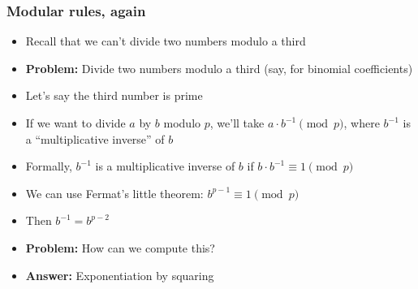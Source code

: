 \documentclass[t, handout]{beamer}
\begin{document}
\begin{frame}[fragile]
    
    \frametitle{Modular rules, again}
    
    \begin{itemize}
        \item Recall that we can't divide two numbers modulo a third
        \pause
        \item \textbf{Problem:} Divide two numbers modulo a third \pause (say, for binomial coefficients)
        \pause
        \item Let's say the third number is prime
        \pause
        \item If we want to divide $a$ by $b$ modulo $p$, we'll take $a \cdot b^{-1} \pmod{p}$, where $b^{-1}$ is a ``multiplicative inverse'' of $b$
        \pause
        \item Formally, $b^{-1}$ is a multiplicative inverse of $b$ if $b \cdot b^{-1} \equiv 1 \pmod{p}$
        \pause
        \item We can use Fermat's little theorem: $b^{p-1} \equiv 1 \pmod{p}$
        \pause
        \item Then $b^{-1} = b^{p-2}$
        \pause
        \item \textbf{Problem:} How can we compute this?
        \pause
        \item \textbf{Answer:} Exponentiation by squaring
    \end{itemize}

\end{frame}
\end{document}
